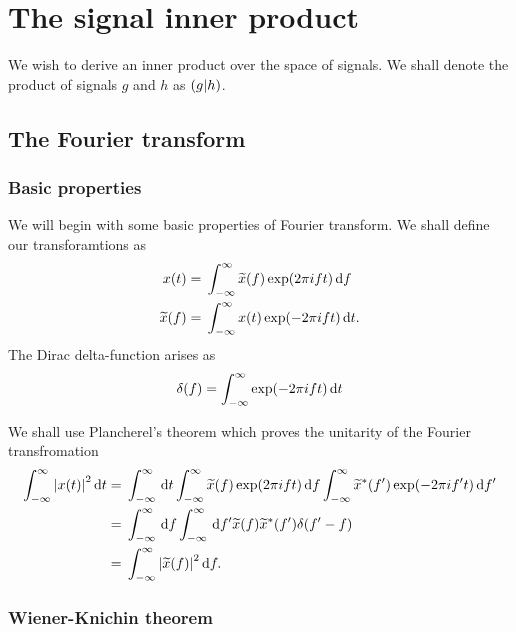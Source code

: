 \chapter{The signal inner product}

We wish to derive an inner product over the space of signals. We shall denote the product of signals $g$ and $h$ as $\left({g}\middle|{h}\right)$.

\section{The Fourier transform}

\subsection{Basic properties}

We will begin with some basic properties of Fourier transform. We shall define our transforamtions as
\begin{subequations}
\begin{align}
x(t) = {} & \int_{-\infty}^{\infty}{\widetilde{x}(f)\exp(2\pi ift)}\,\mathrm{d}{f} \\
\widetilde{x}(f) = {} & \int_{-\infty}^{\infty}{x(t)\exp(-2\pi ift)}\,\mathrm{d}{t}.
\end{align}
\end{subequations}
The Dirac delta-function arises as
\begin{equation}
\delta(f) = \int_{-\infty}^{\infty}{\exp(-2\pi ift)}\,\mathrm{d}{t}
\end{equation}

We shall use Plancherel's theorem which proves the unitarity of the Fourier transfromation
\begin{align}
\int_{-\infty}^{\infty}{\left|x(t)\right|^2}\,\mathrm{d}{t} = {} & \int_{-\infty}^\infty\,\mathrm{d} t \int_{-\infty}^{\infty}{\widetilde{x}(f)\exp(2\pi ift)}\,\mathrm{d}{f} \int_{-\infty}^{\infty}{\widetilde{x}^\ast(f')\exp(-2\pi if't)}\,\mathrm{d}{f'} \nonumber \\
 = {} & \int_{-\infty}^\infty\,\mathrm{d} f \int_{-\infty}^\infty\,\mathrm{d} f' \widetilde{x}(f) \widetilde{x}^\ast(f') \delta(f' - f) \nonumber \\
 = {} & \int_{-\infty}^{\infty}{\left|\widetilde{x}(f)\right|^2}\,\mathrm{d}{f}.
\end{align}

\subsection{Wiener-Knichin theorem}

